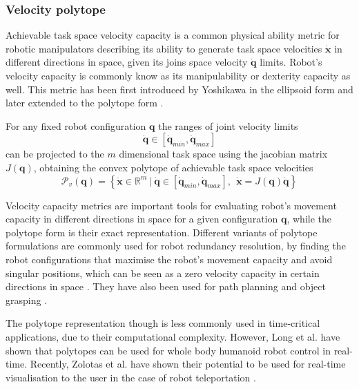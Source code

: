 \subsubsection{Velocity polytope}
\label{ch:vel_poly}

Achievable task space velocity capacity is a common physical ability metric for robotic manipulators describing its ability to generate task space velocities $\dot{\bm{x}}$ in different directions in space, given its joins space velocity $\dot{\bm{q}}$ limits. Robot's velocity capacity is commonly know as its manipulability or dexterity capacity as well. This metric has been first introduced by Yoshikawa \cite{yoshikawa_manipulability_1985} in the ellipsoid form and later extended to the polytope form \cite{chiacchio_global_1991, Lee1997manip}. %

For any fixed robot configuration $\bm{q}$ the ranges of joint velocity limits 
\begin{equation}
   \dot{\bm{q}}\in\left[\dot{\bm{q}}_{min}, \dot{\bm{q}}_{max} \right]
\end{equation}
can be projected to the $m$ dimensional task space using the jacobian matrix $J(\bm{q})$, obtaining the convex polytope of achievable task space velocities  
\begin{equation}
    \mathcal{P}_v(\bm{q}) = \left\{ \dot{\bm{x}} \in \mathbb{R}^m ~|~ \dot{\bm{q}}\in\left[\dot{\bm{q}}_{min}, \dot{\bm{q}}_{max} \right], ~~ \dot{\bm{x}} = J(\bm{q})\dot{\bm{q}} \right\}
    \label{eq:poly_vel_rob}
\end{equation}

Velocity capacity metrics are important tools for evaluating robot's movement capacity in different directions in space for a given configuration $\bm{q}$, while the polytope form is their exact representation. Different variants of polytope formulations are commonly used for robot redundancy resolution, by finding the robot configurations that maximise the robot's movement capacity and avoid singular positions\cite{Marani2002,Thygeson2017}, which can be seen as a zero velocity capacity in certain directions in space \cite{merlet_jacobian_2006}.  They have also been used for path planning \cite{Pardi2020,Nagatani2002} and object grasping \cite{Fei2019,XU2021300}. 

The polytope representation though is less commonly used in time-critical applications, due to their computational complexity. However, Long et al. have shown that polytopes can be used for whole body humanoid robot control \cite{long_constrained_2020} in real-time. Recently, Zolotas et al. have shown their potential to be used for real-time visualisation to the user in the case of robot teleportation \cite{Zolotas2021}. 

